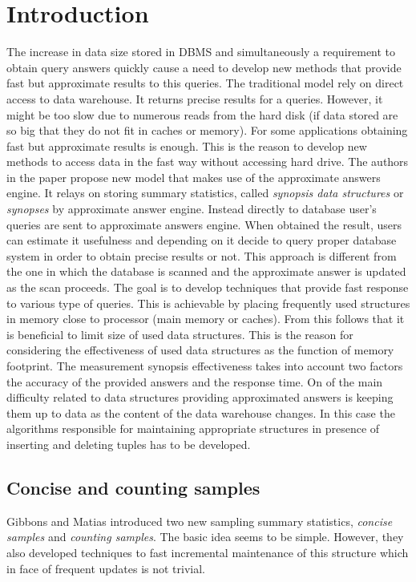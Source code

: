 \section{Introduction}
The increase in data size stored in DBMS and simultaneously a
requirement to obtain query answers quickly cause a need to develop new methods
that provide fast but approximate results to this queries. The traditional
model rely on direct access to data warehouse. It returns precise
results for a queries. However, it might be too slow due to numerous
reads from the hard disk (if data stored are so big that they do not
fit in caches or memory). For some applications
obtaining fast but approximate results is enough.
This is the reason to develop new methods to access data in the fast
way without accessing hard drive. The authors
in the paper \cite{GM98} propose new model that makes use of the
approximate answers engine. It relays on storing summary statistics,
called \textit{synopsis data structures} or \textit{synopses} by
approximate answer engine. Instead
directly to database user's queries are sent to approximate answers engine.
When obtained the result, users can estimate it usefulness and depending on it decide to query proper database system in
order to obtain precise results or not. This approach
is different from the one in which the database is scanned and the approximate
answer is updated as the scan proceeds.
The goal is to develop techniques that provide fast response to
various type of queries. This is achievable by placing frequently used
structures in memory close to processor (main memory or
caches). From this follows that it is beneficial to limit size of used
data structures. This is the reason for considering the effectiveness
of used data structures as the function of memory footprint. The
measurement synopsis effectiveness takes into account two factors the
accuracy of the provided answers and the response time. On of the main
difficulty related to data structures providing approximated answers is
keeping them up to data as the content of the  data warehouse changes.
In this case the algorithms responsible for maintaining appropriate
structures in presence of inserting and deleting tuples has to be
developed.

\subsection{Concise and counting samples}
Gibbons and Matias \cite{GM98} introduced two new sampling summary
statistics, \textit{concise samples} and \textit{counting
  samples}. The basic idea seems to be simple. However,
they also developed techniques to fast incremental maintenance of this
structure which in face of frequent updates is not trivial.

